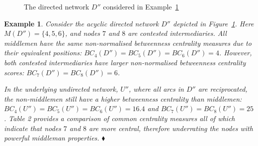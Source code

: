 \documentclass[11pt,fleqn]{article}
\newtheorem{expl}[theorem]{Example}
\newenvironment{example}{\begin{expl} \rm}{\hfill $\blacklozenge$ \end{expl}}{}
\begin{document}
\begin{figure}[t]
\begin{center}
\end{center}
\caption[Differentiating betweenness and middlemen]{The directed network $D''$ considered in Example~\ref{ex:BC}}
\label{mmnmm}
\end{figure}

\begin{example} \label{ex:BC}
Consider the acyclic directed network $D''$ depicted in Figure~\ref{mmnmm}. Here $M(D'') = \{ 4, 5, 6 \}$, and nodes $7$ and $8$ are contested intermediaries. All middlemen have the same non-normalised betweenness centrality measures due to their equivalent positions: $BC_{4}(D'')=BC_{5}(D'')=BC_{6}(D'')=4$. However, both contested intermediaries have larger non-normalised betweenness centrality scores: $BC_{7}(D'')=BC_{8}(D'')=6$.

In the underlying undirected network, $U''$, where all arcs in $D''$ are reciprocated, the non-middlemen still have a higher betweenness centrality than middlemen: $BC_{4}(U'')=BC_{5}(U'')=BC_{6}(U'')=16.4$ and $BC_{7}(U'')=BC_{8}(U'')=25$. Table 2 provides a comparison of common centrality measures all of which indicate that nodes $7$ and $8$ are more central, therefore underrating the nodes with powerful middleman properties.
\end{example}
\end{document}
